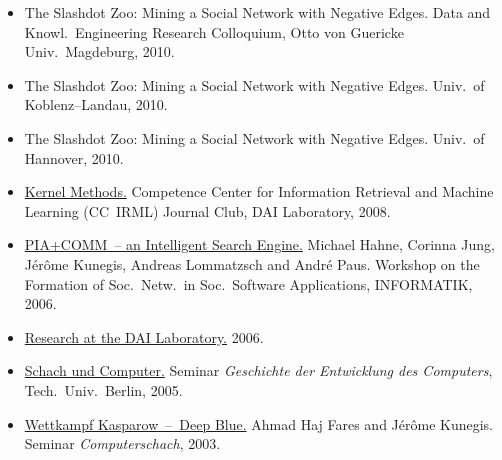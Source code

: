 \documentclass[line,mm]{res}
\newcounter{y}
\newcommand{\talknumber}{T\arabic{y}\stepcounter{y}}
\newcounter{z}
\begin{document}
\begin{resume}
\begin{itemize}
  \item[{[\talknumber]}] The Slashdot Zoo: Mining a Social Network with Negative
    Edges. Data and Knowl.\ Engineering Research Colloquium,
    Otto von Guericke Univ.\ Magdeburg, 2010.  
  \item[{[\talknumber]}] The Slashdot Zoo: Mining a Social Network with Negative
    Edges. Univ.\ of Koblenz--Landau, 2010. 
  \item[{[\talknumber]}] The Slashdot Zoo: Mining a Social Network with Negative
    Edges. Univ.\ of Hannover, 2010. 
  \item[{[\talknumber]}]
    \href{https://github.com/kunegis/pdfs/blob/master/kunegis:kernels-club.presentation.pdf}{Kernel Methods.}
    Competence Center for Information Retrieval and Machine Learning (CC~IRML) Journal Club, DAI Laboratory, 2008. 
  \item[{[\talknumber]}] 
    \href{https://github.com/kunegis/pdfs/blob/master/hahne:gradualisiertes-communitymodell.presentation.pdf}{PIA+COMM~--
      an Intelligent Search Engine.} 
    Michael Hahne, Corinna Jung, Jérôme Kunegis, Andreas Lommatzsch and
    André Paus. 
    Workshop on the Formation of Soc.\ Netw.\ in Soc.\ Software
    Applications, INFORMATIK, 2006. 
  \item[{[\talknumber]}]
    \href{https://github.com/kunegis/pdfs/blob/master/kunegis:research-dai.presentation.pdf}{Research at the DAI Laboratory.}
    2006.
  \item[{[\talknumber]}]
    \href{https://www.slideshare.net/kunegis/schach-und-computer}{Schach und Computer.}
    Seminar \emph{Geschichte der Entwicklung des Computers}, Tech.\ Univ.\ Berlin, 2005.
  \item[{[\talknumber]}]
    \href{https://github.com/kunegis/pdfs/blob/master/kunegis:kasparow-deep-blue.presentation.pdf}{Wettkampf Kasparow~--\ Deep Blue.}
    Ahmad Haj Fares and Jérôme Kunegis.
    Seminar \emph{Computerschach}, 2003. 
\end{itemize}


\end{resume}
\end{document}
